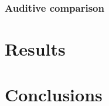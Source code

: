 \documentclass[11pt,twoside,a4paper]{report}
\begin{document}
\subsection{Auditive comparison}


\chapter{Results}
\chapter{Conclusions}

%
%
\cleardoublepage
\iffalse
  
\else


\fi
\cleardoublepage
\end{document}
